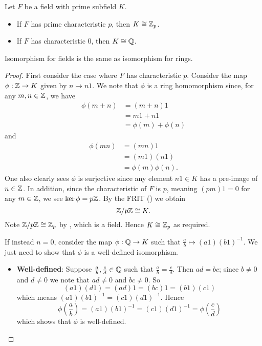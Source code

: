 \begin{theorem}\label{thrm-prime-subfield-isomorphic-to-Zp-or-Q}
    Let $F$ be a field with prime subfield $K$.
    \begin{itemize}
        \item If $F$ has prime characteristic $p$, then $K \cong \mathbb{Z}_p$.
        \item If $F$ has characteristic 0, then $K \cong \mathbb{Q}$.
    \end{itemize}
\end{theorem}
\begin{remark}
    Isomorphism for fields is the same as isomorphism for rings.
\end{remark}
\begin{proof}
    First consider the case where $F$ has characteristic $p$. Consider the map $\phi: \mathbb{Z} \to K$ given by $n \mapsto n1$. We note that $\phi$ is a ring homomorphism since, for any $m, n \in \mathbb{Z}$, we have
    \begin{align*}
        \phi(m + n) &= (m + n)1\\
        &= m1 + n1\\
        &= \phi(m) + \phi(n)
    \end{align*}
    and
    \begin{align*}
        \phi(mn) &= (mn)1\\
        &= (m1)(n1)\\
        &= \phi(m)\phi(n).
    \end{align*}
    One also clearly sees $\phi$ is surjective since any element $n1 \in K$ has a pre-image of $n \in \mathbb{Z}$. In addition, since the characteristic of $F$ is $p$, meaning $(pm)1 = 0$ for any $m \in \mathbb{Z}$, we see $\ker\phi = p\mathbb{Z}$. By the FRIT () we obtain
    \[
        \mathbb{Z}/p\mathbb{Z} \cong K.
    \]
    Note $\mathbb{Z}/p\mathbb{Z} \cong \mathbb{Z}_p$ by , which is a field. Hence $K \cong \mathbb{Z}_p$ as required.

    If instead $n = 0$, consider the map $\phi: \mathbb{Q} \to K$ such that $\frac ab \mapsto (a1)(b1)^{-1}$. We just need to show that $\phi$ is a well-defined isomorphism.
    \begin{itemize}
        \item \textbf{Well-defined}: Suppose $\frac ab, \frac cd \in \mathbb{Q}$ such that $\frac ab = \frac cd$. Then $ad = bc$; since $b \neq 0$ and $d \neq 0$ we note that $ad \neq 0$ and $bc \neq 0$. So
        \[
            (a1)(d1) = (ad)1 = (bc)1 = (b1)(c1)
        \]
        which means $(a1)(b1)^{-1} = (c1)(d1)^{-1}$. Hence
        \[
            \phi\left(\frac ab\right) = (a1)(b1)^{-1} = (c1)(d1)^{-1} = \phi\left(\frac cd\right)
        \]
        which shows that $\phi$ is well-defined.


\end{itemize}
\end{proof}
